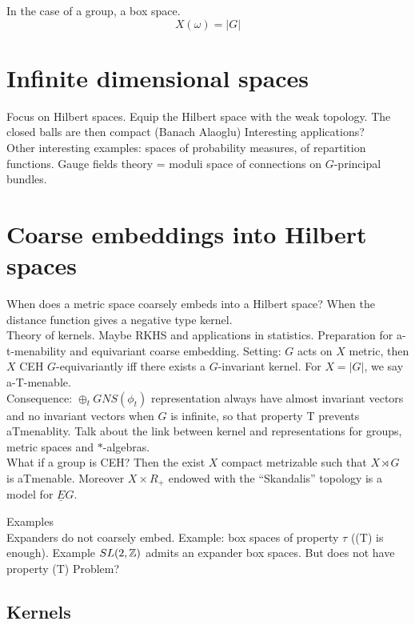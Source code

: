 In the case of a group, a box space.
\[X(\omega) = |G| \]

\section{Infinite dimensional spaces}

Focus on Hilbert spaces. Equip the Hilbert space with the weak topology. The closed balls are then compact (Banach Alaoglu) Interesting applications?\\

Other interesting examples: spaces of probability measures, of repartition functions. Gauge fields theory = moduli space of connections on $G$-principal bundles.

\section{Coarse embeddings into Hilbert spaces}

When does a metric space coarsely embeds into a Hilbert space? When the distance function gives a negative type kernel.\\

Theory of kernels. Maybe RKHS and applications in statistics. Preparation for a-t-menability and equivariant coarse embedding. Setting: $G$ acts on $X$ metric, then $X$ CEH $G$-equivariantly iff there exists a $G$-invariant kernel. For $X= |G|$, we say a-T-menable. \\

Consequence: $\oplus_t GNS(\phi_t)$ representation always have almost invariant vectors and no invariant vectors when $G$ is infinite, so that property T prevents aTmenablity. Talk about the link between kernel and representations for groups, metric spaces and $*$-algebras.\\

What if a group is CEH? Then the exist $X$ compact metrizable such that $X\rtimes G$ is aTmenable. Moreover $X\times R_+$ endowed with the ``Skandalis'' topology is a model for $\underline E G $.

Examples\\

Expanders do not coarsely embed. Example: box spaces of property $\tau$ ((T) is enough). Example $SL(2,\mathbb Z)$ admits an expander box spaces. But does not have property (T) Problem?\\

\subsection{Kernels}

